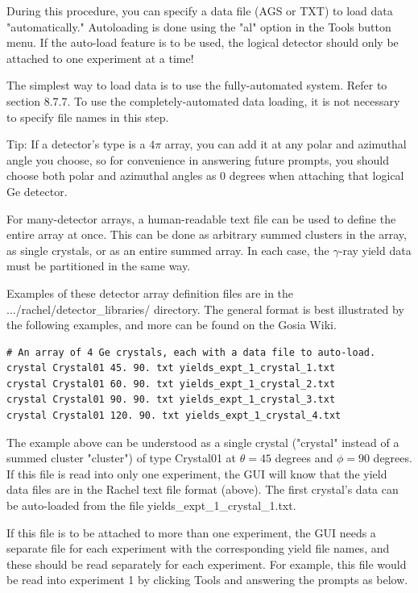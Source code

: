 \documentclass[10pt]{article}
\begin{document}
During this procedure, you can specify a data file (AGS or TXT) to load data "automatically." Autoloading is done using the "al" option in the Tools button menu. If the auto-load feature is to be used, the logical detector should only be attached to one experiment at a time!

The simplest way to load data is to use the fully-automated system. Refer to section 8.7.7. To use the completely-automated data loading, it is not necessary to specify file names in this step.

Tip: If a detector's type is a $4 \pi$ array, you can add it at any polar and azimuthal angle you choose, so for convenience in answering future prompts, you should choose both polar and azimuthal angles as 0 degrees when attaching that logical Ge detector.

For many-detector arrays, a human-readable text file can be used to define the entire array at once. This can be done as arbitrary summed clusters in the array, as single crystals, or as an entire summed array. In each case, the $\gamma$-ray yield data must be partitioned in the same way.

Examples of these detector array definition files are in the .../rachel/detector\_libraries/ directory. The general format is best illustrated by the following examples, and more can be found on the Gosia Wiki.

\begin{verbatim}
# An array of 4 Ge crystals, each with a data file to auto-load.
crystal Crystal01 45. 90. txt yields_expt_1_crystal_1.txt
crystal Crystal01 60. 90. txt yields_expt_1_crystal_2.txt
crystal Crystal01 90. 90. txt yields_expt_1_crystal_3.txt
crystal Crystal01 120. 90. txt yields_expt_1_crystal_4.txt
\end{verbatim}

The example above can be understood as a single crystal ("crystal" instead of a summed cluster "cluster") of type Crystal01 at $\theta=45$ degrees and $\phi=90$ degrees. If this file is read into only one experiment, the GUI will know that the yield data files are in the Rachel text file format (above). The first crystal's data can be auto-loaded from the file yields\_expt\_1\_crystal\_1.txt.

If this file is to be attached to more than one experiment, the GUI needs a separate file for each experiment with the corresponding yield file names, and these should be read separately for each experiment. For example, this file would be read into experiment 1 by clicking Tools and answering the prompts as below.
\end{document}
